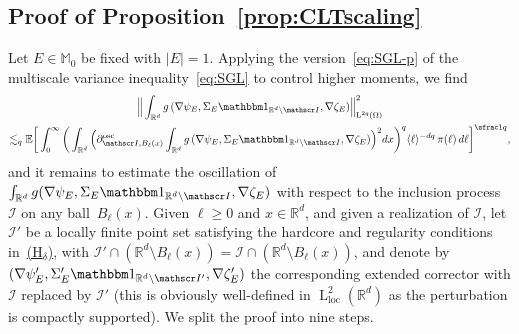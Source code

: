 \documentclass[10pt]{amsart}
\let\mathcal\mathscr
\newcommand{\Hd}{\hyperref[Hd]{\textup{(H$_\delta$)}}\xspace}
\let\mathds\mathbbm
\theoremstyle{plain}
\theoremstyle{definition}
\newcommand{\R}{\mathbb R}
\newcommand{\Ic}{\mathcal I}
\newcommand{\Md}{\mathbb M}
\newcommand{\loc}{{\operatorname{loc}}}
\newcommand{\Ld}{\operatorname{L}}
\newcommand{\E}{\mathbb{E}}
\begin{document}
\subsection{Proof of Proposition~\ref{prop:CLTscaling}}
Let $E\in\Md_0$ be fixed with $|E|=1$.
Applying the version~\eqref{eq:SGL-p} of the multiscale variance inequality~\eqref{eq:SGL} to control higher moments, we find
\begin{multline}\label{eq:SG-phi}
\Big\|\int_{\R^d}g\,(\nabla \psi_E,\Sigma_E\mathds1_{\R^d\setminus\Ic},\nabla\zeta_E)\Big\|_{\Ld^{2q}(\Omega)}^{2}\\
\lesssim_q \E\bigg[\int_0^\infty\bigg(\int_{\R^d}\Big(\partial^{\operatorname{osc}}_{\Ic ,B_\ell(x)}\int_{\R^d}g\,(\nabla \psi_E,\Sigma_E\mathds1_{\R^d\setminus\Ic},\nabla\zeta_E)\Big)^2dx\bigg)^q\langle\ell\rangle^{-dq}\,\pi(\ell)\,d\ell\bigg]^{\sfrac1q},
\end{multline}
and it remains to estimate the oscillation of $\int_{\R^d} g(\nabla \psi_E,\Sigma_E\mathds1_{\R^d\setminus\Ic},\nabla\zeta_E)$ with respect to the inclusion process $\Ic $ on any ball~$B_\ell(x)$.
Given $\ell\ge0$ and $x\in\R^d$, and given a realization of $\Ic$, let $\Ic '$ be a locally finite point set satisfying the hardcore and regularity conditions in~\Hd, with $\Ic '\cap(\R^d\setminus B_\ell(x))=\Ic \cap(\R^d\setminus B_\ell(x))$, and denote by~$(\nabla\psi'_E,\Sigma_E'\mathds1_{\R^d\setminus\Ic'},\nabla\zeta_E')$ the corresponding extended corrector with $\Ic $ replaced by $\Ic'$ (this is obviously well-defined in $\Ld^2_\loc(\R^d)$ as the perturbation is compactly supported).
We split the proof into nine steps.
\end{document}
